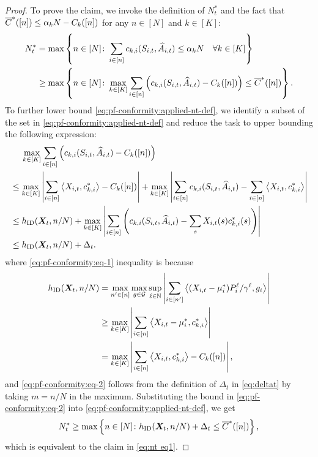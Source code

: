 \begin{proof}
To prove the claim, we invoke the definition of $N_t^*$ and the fact that $\overline{C}^*([n])\leq \alpha_k N - C_k([n])$ for any $n\in [N]$ and $k\in[K]$: 
    \begin{align}
        \nonumber
        N_t^* 
        &= \max\left\{ n\in[N]\colon  \sum_{i\in[n]} c_{k,i}(S_{i,t},\widehat{A}_{i,t})  \leq \alpha_k N \quad \forall k\in[K] \right\}     \\
        \label{eq:pf-conformity:applied-nt-def}
        &\geq \max\left\{ n\in[N]\colon \max_{k\in[K]}  \sum_{i\in[n]} \left(c_{k,i}(S_{i,t},\widehat{A}_{i,t}) - C_k([n]) \right) \leq \overline{C}^*([n]) \right\}.
    \end{align}
    To further lower bound \eqref{eq:pf-conformity:applied-nt-def}, we identify a subset of the set in \eqref{eq:pf-conformity:applied-nt-def} and reduce the task to upper bounding the following expression: 
    \begin{align}
        \nonumber
        &\mspace{23mu} \max_{k\in[K]}  \sum_{i\in[n]} \left( c_{k,i}(S_{i,t},\widehat{A}_{i,t}) - C_k([n]) \right) \\
        \nonumber
        &\leq\max_{k\in[K]} \left\lvert\sum_{i\in[n]}\left\langle X_{i,t}, c_{k,i}^* \right\rangle- C_k([n])\right\rvert+ \max_{k\in[K]} \left\lvert\sum_{i\in[n]}c_{k,i}(S_{i,t},\widehat{A}_{i,t})- \sum_{i\in[n]}\left\langle X_{i,t}, c_{k,i}^* \right\rangle\right\rvert\\
        \label{eq:pf-conformity:eq-1}
        &\leq h_{\textnormal{ID}}({\bm{X}}_t,n/N) + \max_{k\in[K]} \left\lvert\sum_{i\in[n]}\left(c_{k,i}(S_{i,t},\widehat{A}_{i,t})- \sum_{s}X_{i,t}(s)c_{k,i}^*(s)\right)\right\rvert \\
        \label{eq:pf-conformity:eq-2}
        &\leq h_{\textnormal{ID}}({\bm{X}}_t,n/N) + \Delta_t. 
    \end{align}
    where \eqref{eq:pf-conformity:eq-1} inequality is because  
    \begin{align*}
        h_{\textnormal{ID}}({\bm{X}}_t,n/N)&=\max_{n'\in[n]}\max_{g\in \mathcal{G}} \sup_{\ell\in\mathbb{N}} \left\lvert\sum_{i\in[n']}\left\langle (X_{i,t}-\mu_i^*)P_i^{\ell}/\gamma^{\ell}, g_i \right\rangle\right\rvert\\
        &\geq \max_{k\in[K]}\left\lvert\sum_{i\in[n]}\left\langle X_{i,t}-\mu_i^*, c_{k,i}^* \right\rangle\right\rvert\\
        &=\max_{k\in[K]}\left\lvert\sum_{i\in[n]}\left\langle X_{i,t}, c_{k,i}^* \right\rangle- C_k([n])\right\rvert,
    \end{align*} 
    and \eqref{eq:pf-conformity:eq-2} follows from the definition of $\Delta_t$ in \eqref{eq:deltat} by taking $m=n/N$ in the maximum. 
    Substituting the bound in \eqref{eq:pf-conformity:eq-2} into \eqref{eq:pf-conformity:applied-nt-def}, we get
    \[
        N^*_t \geq \max\left\{ n\in[N]\colon h_{\textnormal{ID}}({\bm{X}}_t,n/N) + \Delta_t \leq \overline{C}^*([n]) \right\},
    \]
    which is equivalent to the claim in \eqref{eq:nt eq1}. 



\end{proof}
